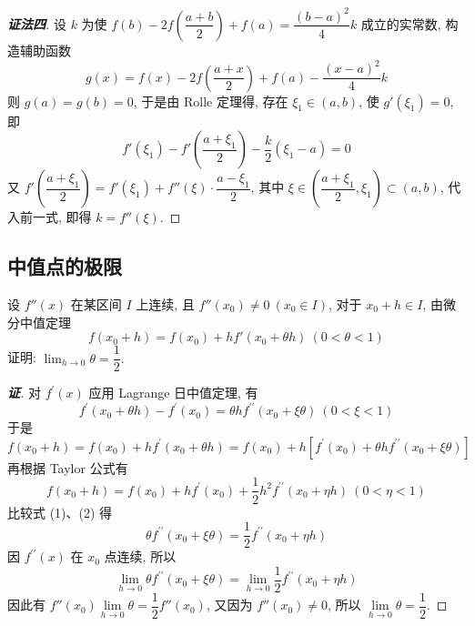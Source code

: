 \begin{proof}[{\songti \textbf{证法四}}]
    设 $k$ 为使 $f(b)-2f\left(\dfrac{a+b}{2}\right)+f(a)=\dfrac{(b-a)^{2}}{4}k$ 成立的实常数, 
    构造辅助函数 $$g(x)=f(x)-2f\left(\dfrac{a+x}{2}\right)+f(a)-\dfrac{(x-a)^{2}}{4}k$$
    则 $g(a)=g(b)=0$, 于是由 Rolle 定理得, 存在 $\xi_{1}\in(a,b)$, 使 $g'(\xi_{1})=0$, 即 $$f'(\xi_{1})-f'\left(\dfrac{a+\xi_{1}}{2}\right)-\dfrac{k}{2}(\xi_{1}-a)=0$$
    又 $f'\left(\dfrac{a+\xi_{1}}{2}\right)=f'(\xi_{1})+f''(\xi)\cdot\dfrac{a-\xi_{1}}{2}$, 其中 $\xi\in\left(\dfrac{a+\xi_{1}}{2},\xi_{1}\right)\subset(a,b)$, 
    代入前一式, 即得 $k=f''(\xi)$.
\end{proof}

\subsection{中值点的极限}

\begin{example}
    设 $f''(x)$ 在某区间 $I$ 上连续, 且 $f''(x_0)\neq0~ (x_0\in I)$, 对于 $x_0+h\in I$, 由微分中值定理
    $$f(x_0+h)  =f(x_0)  +hf'(x_{0}+\theta h)  ~ ( 0 <\theta  < 1) $$
    证明: $\displaystyle\lim_{h\to0}\theta=\dfrac{1}{2}.$
\end{example}
\begin{proof}[{\songti \textbf{证}}]
    对 $f^{\prime}(x)$  应用 Lagrange 日中值定理, 有
    $$f^{\prime}\left(x_{0}+\theta h\right)-f^{\prime}(x_0) =\theta h f^{\prime \prime}(x_0+\xi \theta)  ~ (0<\xi<1)$$
    于是
    \begin{equation}
        f\left(x_{0}+h\right)=f(x_0) +h f^{\prime}\left(x_{0}+\theta h\right)=f(x_0) +h\left[f^{\prime}(x_0) +\theta h f^{\prime \prime}(x_0+\xi \theta) \right]\tag{1}
    \end{equation}
    再根据 Taylor 公式有
    \begin{equation}
        f\left(x_{0}+h\right)=f(x_0) +h f^{\prime}(x_0) +\dfrac{1}{2} h^{2} f^{\prime \prime}\left(x_{0}+\eta h\right) ~ (0<\eta<1)\tag{2}
    \end{equation}
    比较式 (1)、(2) 得
    $$\theta f^{\prime \prime}(x_0+\xi \theta) =\dfrac{1}{2} f^{\prime \prime}\left(x_{0}+\eta h\right)$$
    因 $f^{\prime \prime}(x)$ 在 $x_{0}$ 点连续, 所以
    $$\lim _{h \to 0} \theta f^{\prime \prime}(x_0+\xi \theta) =\lim _{h \to 0} \dfrac{1}{2} f^{\prime \prime}\left(x_{0}+\eta h\right)$$
    因此有 $f''(x_0)\lim\limits_{h\to0}\theta=\dfrac{1}{2}f''(x_0)$, 又因为 $f''(x_0)\neq0$, 所以 $\lim\limits_{h\to0}\theta=\dfrac{1}{2}.$
\end{proof}

